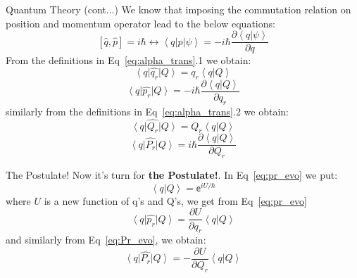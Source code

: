\documentclass{beamer}
\newcommand{\ket}[1]{\left|#1\right \rangle}
\newcommand{\bra}[1]{\left\langle#1\right |}
\newcommand{\inner}[2]{\left\langle#1|#2\right\rangle}
\renewcommand{\exp}[1]{\mathsf{e}^{#1}}
\begin{document}
\begin{frame}{Quantum Theory (cont...)}
    We know that imposing the commutation relation on position and momentum operator lead to the below equations:
    \begin{equation}
        \label{eq:commutator}
        \left[ \hat{q}, \hat{p}\right] = i \hbar \longleftrightarrow \bra{q}\hat{p}\ket{\psi} = -i\hbar \dfrac{\partial \inner{q}{\psi}}{\partial q}
    \end{equation}
    From the definitions in Eq~\ref{eq:alpha_trans}.1 we obtain:
   \begin{equation}
   \label{eq:qr_evo}
    \bra{q}\hat{q_r}\ket{Q} = q_r \inner{q}{Q}
    \end{equation}
    \begin{equation}
        \label{eq:pr_evo}
        \bra{q}{\hat{p_r}}\ket{Q} = -i \hbar \dfrac{\partial \inner{q}{Q}}{\partial q_r}
    \end{equation}
    similarly  from the definitions in Eq~\ref{eq:alpha_trans}.2 we obtain:
    \begin{equation}
    \label{eq:Qr_evo}
    \bra{q}\hat{Q_r}\ket{Q} = Q_r \inner{q}{Q}
    \end{equation}
    \begin{equation}
    \label{eq:Pr_evo}
        \bra{q}{\hat{P_r}}\ket{Q} = i \hbar \dfrac{\partial \inner{q}{Q}}{\partial Q_r}
    \end{equation}
\end{frame}
\begin{frame}{The Postulate!}
    Now it's turn for \textbf{the Postulate!}. In Eq~\ref{eq:pr_evo} we put:
    \begin{equation}
    \label{eq:postulate}
        \boxed{\inner{q}{Q} = \exp{iU/\hbar}}
    \end{equation}
    where \(U\) is a new function of q's and Q's, we get from Eq~\ref{eq:pr_evo}
    \begin{equation}
        \label{eq:pr_postulate}
        \bra{q}{\hat{p_r}}\ket{Q} =  \dfrac{\partial U}{\partial q_r}\inner{q}{Q}
    \end{equation}
    and similarly from Eq~\ref{eq:Pr_evo}, we obtain:
    \begin{equation}
         \label{eq:Pr_postulate}
        \bra{q}{\hat{P_r}}\ket{Q} =  - \dfrac{\partial U}{\partial Q_r}\inner{q}{Q}
    \end{equation}
\end{frame}
\end{document}
